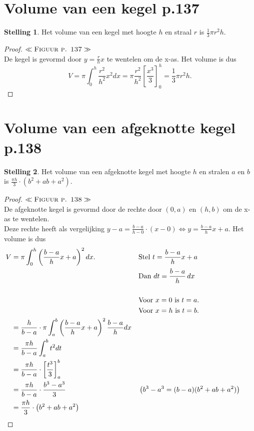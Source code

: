 \documentclass{article}
\theoremstyle{definition}
\newtheorem*{Stelling}{Stelling}
\begin{document}
\section{Volume van een kegel p.137}
\begin{Stelling}
    Het volume van een kegel met hoogte $h$ en straal $r$ is $\frac{1}{3}\pi r^2h.$
\end{Stelling}
\begin{proof}
   $\ll\textsc{Figuur p. 137}\gg$\\ De kegel is gevormd door $y=\frac{r}{h}x$ te wentelen om de x-as. Het volume is dus $$V = \pi\int_0^h \frac{r^2}{h^2}x^2 dx= \pi \frac{r^2}{h^2} \left[\frac{x^3}{3}\right]_0^h = \frac{1}{3}\pi r^2h.$$
\end{proof}
\section{Volume van een afgeknotte kegel p.138}
\begin{Stelling}
    Het volume van een afgeknotte kegel met hoogte $h$ en stralen $a$ en $b$ is $\frac{\pi h}{3}\cdot \left(b^2+ab+a^2\right).$
\end{Stelling}
\begin{proof}
    $\ll\textsc{Figuur p. 138}\gg$\\ De afgeknotte kegel is gevormd door de rechte door $(0,a)$ en $(h,b)$ om de x-as te wentelen. \\Deze rechte heeft als vergelijking $y-a = \frac{b-a}{h-0}\cdot(x-0) \iff y = \frac{b-a}{h}x+a$.
    Het volume is dus 
    \begin{alignat*}{3}
        V &= \pi\int_0^h\left(\frac{b-a}{h}x+a\right)^2 dx. \quad &&\text{Stel } t=\frac{b-a}{h}x+a\\
        & &&\text{Dan }dt = \frac{b-a}{h}\, dx\\
        \\&&&\text{Voor } x=0 \text{ is } t=a.&&\\
        &&&\text{Voor } x=h \text{ is } t=b.&&\\
    &=\frac{h}{b-a}\cdot\pi\int_a^b\left(\frac{b-a}{h}x+a\right)^2\frac{b-a}{h} dx\\ &= \frac{\pi h}{b-a}\int_a^bt^2 dt\\&= \frac{\pi h}{b-a} \cdot \left[\frac{t^3}{3}\right]_a^b\\&=\frac{\pi h}{b-a}\cdot\frac{b^3-a^3}{3}&&\left(\tiny b^3-a^3 = (b-a)(b^2+ab+a^2)\right)\\
    &=\frac{\pi h}{3}\cdot\left(b^2+ab+a^2\right)
    \end{alignat*}
\end{proof}
\newpage
\end{document}
